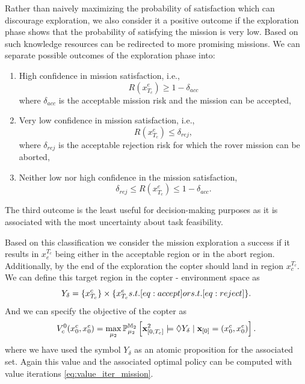 \documentclass[conference]{IEEEtran}
\begin{document}
Rather than naively maximizing the probability of satisfaction which can discourage exploration, we also consider it a positive outcome if the exploration phase shows that the probability of satisfying the mission is very low. Based on such knowledge resources can be redirected to more promising missions. We can separate possible outcomes of the exploration phase into:

\begin{enumerate}
	\item High confidence in mission satisfaction, i.e.,
\begin{equation}\label{eq:accept}
	R(x^e_{T_c})\geq 1-\delta_{acc}
\end{equation}
where $\delta_{acc}$ is the acceptable mission risk and the mission can be accepted,
	\item Very low confidence in mission satisfaction,  i.e.,
\begin{equation}\label{eq:reject}
	R(x^e_{T_c})\leq \delta_{rej},
\end{equation}
where $\delta_{rej}$ is the acceptable rejection risk for which the  rover mission can be aborted,
	\item Neither low nor high confidence in the mission satisfaction,
	 \begin{equation}
	\delta_{rej} \leq R(x^e_{T_c})\leq 1-\delta_{acc}.
\end{equation}
\end{enumerate}
The third outcome is the least useful for decision-making purposes as it is associated with the most uncertainty about task feasibility.

Based on this classification we consider the mission exploration a success if it results in $x_e^{T_c}$ being either in the acceptable region or in the abort region. Additionally, by the end of the exploration the copter should land  in region $x^{T_c}_c$. We can define this target region in the copter - environment space as
\begin{equation}
Y_\delta = \{x_{T_c}^c\}\times
	\{x^e_{T_c} \mbox{ s.t.  }\eqref{eq:accept}\mbox{ or s.t. }\eqref{eq:reject} \}.
\end{equation}
And we can specify the objective of the copter as
\begin{equation}
\label{eq:coptervalue}
	V^0_c(x^c_0, x^e_0) = \max_{\mu_2} \mathbb{P}_{\mu_2}^{\MDP_2} \left[ \mathbf{x}^2_{[0, T_c]} \models \lozenge Y_\delta \mid \mathbf{x}_{[0]} = (x^c_0, x^e_0) \right].
\end{equation}
where we have used the symbol $Y_\delta$ as an atomic proposition for the associated set.
Again this value and the associated optimal policy can be computed with value iterations \eqref{eq:value_iter_mission}.
\end{document}

